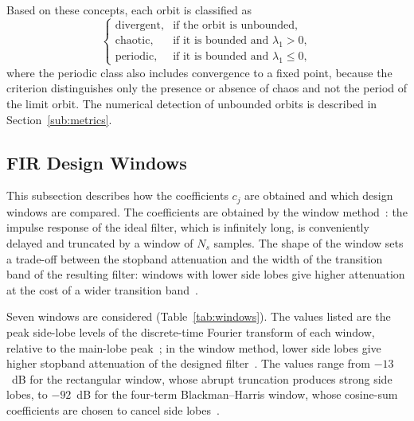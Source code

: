 \documentclass[journal]{IEEEtran}
\begin{document}
Based on these concepts, each orbit is classified as
\begin{equation}
  \begin{cases}
    \text{divergent}, & \text{if the orbit is unbounded},\\
    \text{chaotic},   & \text{if it is bounded and } \lambda_1 > 0, \\
    \text{periodic},  & \text{if it is bounded and } \lambda_1 \le 0,
  \end{cases}
  \label{eq:criterio}
\end{equation}
where the periodic class also includes convergence to a fixed point, because
the criterion distinguishes only the presence or absence of chaos and not the
period of the limit orbit. The numerical detection of unbounded orbits is
described in Section~\ref{sub:metrics}.

\subsection{FIR Design Windows}\label{sub:windows}
This subsection describes how the coefficients $c_j$ are obtained and which
design windows are compared. The coefficients are obtained by the window
method~\cite{Oppenheim2009,Harris1978}: the impulse response of the ideal
filter, which is infinitely long, is conveniently delayed and truncated by a
window of $N_s$ samples. The shape of the window sets a trade-off between the
stopband attenuation and the width of the transition band of the resulting
filter: windows with lower side lobes give higher attenuation at the cost of
a wider transition band~\cite{Harris1978}.

Seven windows are considered (Table~\ref{tab:windows}). The values listed
are the peak side-lobe levels of the discrete-time Fourier transform of each
window, relative to the main-lobe peak~\cite{Harris1978}; in the window
method, lower side lobes give higher stopband attenuation of the designed
filter~\cite{Oppenheim2009}. The values range from $-13$~dB for the
rectangular window, whose abrupt truncation produces strong side lobes, to
$-92$~dB for the four-term Blackman--Harris window, whose cosine-sum
coefficients are chosen to cancel side lobes~\cite{Harris1978}.
\end{document}

